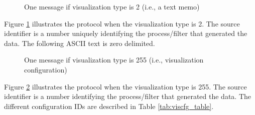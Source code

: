 \documentclass[letterpaper,oneside,12pt]{book}
\begin{document}
\begin{figure}[ht]
 \centerline{}
 \caption{One message if visualization type is 2 (i.e., a text memo)}
 \label{visualizationprotocol_type2}
\end{figure}

Figure \ref{visualizationprotocol_type2} illustrates the protocol when the 
visualization type is 2. The source identifier is a number uniquely 
identifying the process/filter that generated the data. The following ASCII
text is zero delimited.

\begin{figure}[ht]
 \centerline{}
 \caption{One message if visualization type is 255 (i.e., visualization configuration)}
 \label{visualizationprotocol_type255}
\end{figure}

Figure \ref{visualizationprotocol_type255} illustrates the protocol when the 
visualization type is 255. The source identifier is a number 
identifying the process/filter that generated the data. The different 
configuration IDs are described in Table \ref{tab:viscfg_table}.
\end{document}
